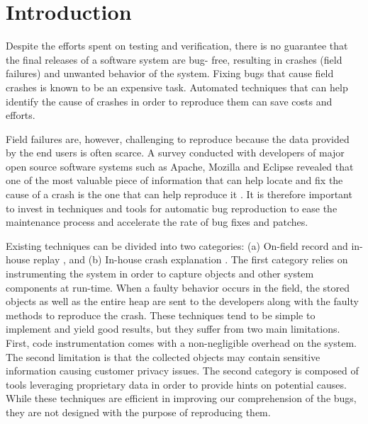 \documentclass[times]{smrauth}
\begin{document}
\maketitle


\section{Introduction}

Despite the efforts spent on testing and verification, there is no
guarantee that the final releases of a software system are bug-
free, resulting in crashes (field failures) and unwanted
behavior of the system. Fixing bugs that cause field crashes is
known to be an expensive task. Automated techniques that can
help identify the cause of crashes in order to reproduce them
can save costs and efforts.

Field failures are, however, challenging to reproduce because
the data provided by the end users is often scarce. A survey
conducted with developers of major open source software
systems such as Apache, Mozilla and Eclipse revealed that
one of the most valuable piece of information that can help
locate and fix the cause of a crash is the one that can help
reproduce it \cite{Bettenburg2008}. It is therefore important to invest in
techniques and tools for automatic bug reproduction to ease
the maintenance process and accelerate the rate of bug fixes
and patches.

Existing techniques can be divided into two categories: (a)
On-field record and in-house replay \cite{Narayanasamy2005,Artzi2008,Jaygarl}, and (b) In-house crash explanation \cite{Manevich2004,chandra2009snugglebug}. The first category relies on
instrumenting the system in order to capture objects and other
system components at run-time. When a faulty behavior
occurs in the field, the stored objects as well as the entire heap
are sent to the developers along with the faulty methods to
reproduce the crash. These techniques tend to be simple to
implement and yield good results, but they suffer from two
main limitations. First, code instrumentation comes with a
non-negligible overhead on the system. The second limitation
is that the collected objects may contain sensitive information
causing customer privacy issues. The second category is
composed of tools leveraging proprietary data in order to
provide hints on potential causes. While these techniques are
efficient in improving our comprehension of the bugs, they are
not designed with the purpose of reproducing them.
\end{document}
